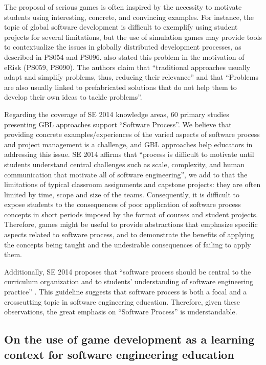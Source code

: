 The proposal of serious games is often inspired by the necessity to motivate students using interesting, concrete, and convincing examples. For instance, the topic of global software development is difficult to exemplify using student projects for several limitations, but the use of simulation games may provide tools to contextualize the issues in globally distributed development processes, as described in PS054 and PS096.  \cite{Oliveira:2013} also stated this problem in the motivation of eRisk (PS059, PS090). The authors claim that “traditional approaches usually adapt and simplify problems, thus, reducing their relevance” and that “Problems are also usually linked to prefabricated solutions that do not help them to develop their own ideas to tackle problems”.

Regarding the coverage of SE 2014 knowledge areas, 60 primary studies presenting GBL approaches support “Software Process”. We believe that providing concrete examples/experiences of the varied aspects of software process and project management is a challenge, and GBL approaches help educators in addressing this issue. SE 2014 \citep{Acm:2015} affirms that “process is difficult to motivate until students understand central challenges such as scale, complexity, and human communication that motivate all of software engineering”, we add to that the limitations of typical classroom assignments and capstone projects: they are often limited by time, scope and size of the teams. Consequently, it is difficult to expose students to the consequences of poor application of software process concepts in short periods imposed by the format of courses and student projects. Therefore, games might be useful to provide abstractions that emphasize specific aspects related to software process, and to demonstrate the benefits of applying the concepts being taught and the undesirable consequences of failing to apply them.

Additionally, SE 2014 proposes that “software process should be central to the curriculum organization and to students’ understanding of software engineering practice” \citep{Acm:2015}. This guideline suggests that software process is both a focal and a crosscutting topic in software engineering education. Therefore, given these observations, the great emphasis on “Software Process” is understandable.

\subsection{On the use of game development as a learning context for software engineering education}
\label{sec:smsdiscussiongdbl}

